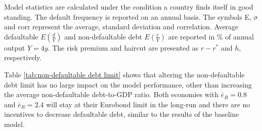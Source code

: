 \begin{table}[H]\large
\setlength{\arrayrulewidth}{0.3mm}
\centering
    \caption{\textbf{Sensitivity of results to the non-defaultable debt limit}}
    \label{tab:non-defaultable debt limit}
    \vspace{1mm}
    \begin{tablenotes}
      \footnotesize
      \item Model statistics are calculated under the condition a country finds itself in good standing. The default frequency is reported on an annual basis. The symbols E, $\sigma$ and corr represent the average, standard deviation and correlation. Average defaultable $E(\frac{d}{Y})$ and non-defaultable debt $E(\frac{e}{Y})$ are reported in \% of annual output $Y = 4y$. The risk premium and haircut are presented as $r-r^*$ and $h$, respectively.
    \end{tablenotes}
\end{table}
Table \ref{tab:non-defaultable debt limit} shows that altering the non-defaultable debt limit has no large impact on the model performance, other than increasing the average non-defaultable debt-to-GDP ratio. Both economies with $\bar{e}_R = 0.8$ and $\bar{e}_R = 2.4$ will stay at their Eurobond limit in the long-run and there are no incentives to decrease defaultable debt, similar to the results of the baseline model.\\
